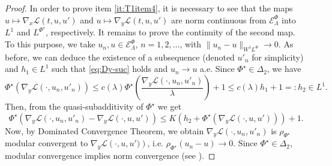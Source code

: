 \documentclass[twoside]{article}
\theoremstyle{remark}
\newcommand{\lphi}{L^{\Phi}}
\newcommand{\lpsi}{L^{\Phi^{\star}}}
\newcommand{\sobnor}{\|_{W^{1}\lphi}}
\newcommand{\domi}{\mathcal{E}^{\Phi}}
\renewcommand{\leq}{\leqslant}
\begin{document}
\begin{proof}
In order to prove item  \ref{it:T1item4}, it is necessary to see that the maps \linebreak[4]$u\mapsto \nabla_x\mathcal{L}(t,u,u')$  
and $u\mapsto \nabla_y\mathcal{L}(t,u,u')$  are norm continuous
from $\domi_{\Lambda} $ into $L^1$ and
 $\lpsi$, respectively.  
It remains to prove the continuity of the second map. 
To this purpose, we take  $u_n, u \in \domi_{\Lambda}$, $n=1,2,\dots$, with $\|u_n- u\sobnor\to 0$.  
As before, we can deduce the existence of a subsequence (denoted $u'_n$ for simplicity) and $h_1 \in L^1$ such that \eqref{eq:Dy-suc} holds and $u_n \to u$ a.e.
 Since $\Phi^{\star}\in\Delta_2$, we have 
\begin{equation}
\Phi^{\star}(\nabla_y \mathcal{L}(\cdot,u_n,u'_n))\leq c(\lambda) \Phi^{\star}\left(\frac{\nabla_y \mathcal{L}(\cdot,u_n,u'_n)}{\lambda}\right)+1\leq c(\lambda)h_1+1=:h_2\in L^1.
\end{equation} 
Then, from the quasi-subadditivity of $\Phi^{\star}$ we get 
\[\Phi^{\star}\left(\nabla_y \mathcal{L}(\cdot,u_n,u'_n)-
\nabla_y \mathcal{L}(\cdot,u,u')\right)\leq K (h_2+\Phi^{\star}(\nabla_y \mathcal{L}(\cdot,u,u')))+1.\]
Now, by Dominated Convergence Theorem, we obtain 
$\nabla_y \mathcal{L}(\cdot,u_n,u'_n)$ is $\rho_{\Phi^{\star}}$ modular convergent to $\nabla_y \mathcal{L}\left(\cdot,u,u')\right)$, i.e.
$\rho_{\Phi^{\star}}(u_n-u)\to 0$. 
Since $\Phi^{\star} \in \Delta_2$, modular convergence implies norm convergence (see \cite{Skaff1969}).
\end{proof}
\end{document}
